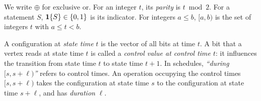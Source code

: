 We write $\oplus$ for exclusive or. For an integer $t$, its \emph{parity} is $t\bmod 2$. For a
statement $S$, $\mathbf{1}\{S\}\in\{0,1\}$ is its indicator. For integers $a\le b$, $[a,b)$ is the set of
integers $t$ with $a\le t<b$.

A configuration at \emph{state time} $t$ is the vector of all bits at time $t$. A bit that a
vertex reads at state time $t$ is called a \emph{control value at control time $t$}: it influences
the transition from state time $t$ to state time $t+1$. In schedules, \emph{``during $[s,s+\ell)$''}
refers to control times. An operation occupying the control times $[s,s+\ell)$ takes the
configuration at state time $s$ to the configuration at state time $s+\ell$, and has
\emph{duration} $\ell$.
